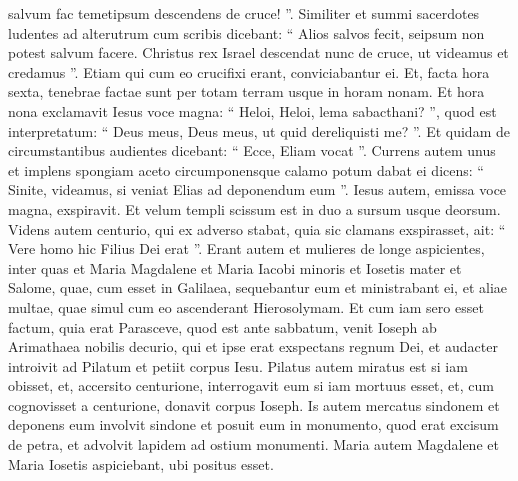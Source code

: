 \begin{biblechapter}
\begin{biblechapter}
\begin{biblechapter}
\begin{biblechapter}
\begin{biblechapter}
\begin{biblechapter}
\begin{biblechapter}
\begin{biblechapter}
\begin{biblechapter}
\begin{biblechapter}
\begin{biblechapter}
\begin{biblechapter}
\begin{biblechapter}
\begin{biblechapter}
\begin{biblechapter}
 \verse salvum fac temetipsum descendens de cruce! ”. 
\verse Similiter et summi sacerdotes ludentes ad alterutrum cum scribis dicebant: “ Alios salvos fecit, seipsum non potest salvum facere. 
\verse Christus rex Israel descendat nunc de cruce, ut videamus et credamus ”. Etiam qui cum eo crucifixi erant, conviciabantur ei.
 \verse Et, facta hora sexta, tenebrae factae sunt per totam terram usque in horam nonam. 
\verse Et hora nona exclamavit Iesus voce magna: “ Heloi, Heloi, lema sabacthani? ”, quod est interpretatum: “ Deus meus, Deus meus, ut quid dereliquisti me? ”. 
\verse Et quidam de circumstantibus audientes dicebant: “ Ecce, Eliam vocat ”. 
\verse Currens autem unus et implens spongiam aceto circumponensque calamo potum dabat ei dicens: “ Sinite, videamus, si veniat Elias ad deponendum eum ”. 
\verse Iesus autem, emissa voce magna, exspiravit.
 \verse Et velum templi scissum est in duo a sursum usque deorsum.
 \verse Videns autem centurio, qui ex adverso stabat, quia sic clamans exspirasset, ait: “ Vere homo hic Filius Dei erat ”.
 \verse Erant autem et mulieres de longe aspicientes, inter quas et Maria Magdalene et Maria Iacobi minoris et Iosetis mater et Salome, 
\verse quae, cum esset in Galilaea, sequebantur eum et ministrabant ei, et aliae multae, quae simul cum eo ascenderant Hierosolymam.
 \verse Et cum iam sero esset factum, quia erat Parasceve, quod est ante sabbatum, 
 \verse venit Ioseph ab Arimathaea nobilis decurio, qui et ipse erat exspectans regnum Dei, et audacter introivit ad Pilatum et petiit corpus Iesu. 
\verse Pilatus autem miratus est si iam obisset, et, accersito centurione, interrogavit eum si iam mortuus esset, 
\verse et, cum cognovisset a centurione, donavit corpus Ioseph. 
\verse Is autem mercatus sindonem et deponens eum involvit sindone et posuit eum in monumento, quod erat excisum de petra, et advolvit lapidem ad ostium monumenti. 
\verse Maria autem Magdalene et Maria Iosetis aspiciebant, ubi positus esset.
 

\end{biblechapter}
\end{biblechapter}
\end{biblechapter}
\end{biblechapter}
\end{biblechapter}
\end{biblechapter}
\end{biblechapter}
\end{biblechapter}
\end{biblechapter}
\end{biblechapter}
\end{biblechapter}
\end{biblechapter}
\end{biblechapter}
\end{biblechapter}
\end{biblechapter}
